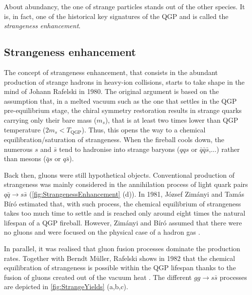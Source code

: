 About abundancy, the one of strange particles stands out of the other species. It is, in fact, one of the historical key signatures of the QGP and is called the \textit{strangeness enhancement}. 

\subsection{Strangeness enhancement}
\label{subsec:StrangenessEnhanement}

The concept of strangeness enhancement, that consists in the abundant production of strange hadrons in heavy-ion collisions, starts to take shape in the mind of Johann Rafelski in 1980. The original argument is based on the assumption that, in a melted vacuum such as the one that settles in the QGP pre-equilibrium stage, the chiral symmetry restoration results in strange quarks carrying only their bare mass ($m_{s}$), that is at least two times lower than QGP temperature ($2 m_{s} < T_{\textrm{QGP}}$). Thus, this opens the way to a chemical equilibration/saturation of strangeness. When the fireball cools down, the numerous $s$ and $\bar{s}$ tend to hadronise into strange baryons ($qqs$ or $\bar{q}\bar{q}\bar{s}$,...) rather than mesons ($\bar{q}s$ or $q\bar{s}$).

Back then, gluons were still hypothetical objects. Conventional production of strangeness was mainly considered in the annihilation process of light quark pairs $q\bar{q} \rightarrow s \bar{s}$ (\fig \ref{fig:StrangenessEnhancement} (d)). In 1981, J\'ozsef Zim\'anyi and Tam\'as B\'ir\'o estimated that, with such process, the chemical equilibrium of strangeness takes too much time to settle and is reached only around eight times the natural lifespan of a QGP fireball. However, Zim\'anyi and B\'ir\'o assumed that there were no gluons and were focused on the physical case of a hadron gas \cite{rafelskiStrangenessEnhancement2008}.

In parallel, it was realised that gluon fusion processes dominate the production rates. Together with Berndt M\"{u}ller, Rafelski shows in 1982 that the chemical equilibration of strangeness is possible within the QGP lifespan thanks to the fusion of gluons created out of the vacuum heat  \cite{rafelskiStrangenessProductionQuarkGluon1982}. The different $gg \rightarrow s\bar{s}$ processes are depicted in \fig\ref{fig:StrangeYields} (a,b,c).


